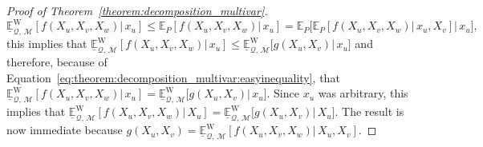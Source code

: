 \documentclass[10pt,a4paper]{paper}
\theoremstyle{definition}
\newcommand{\states}{\mathcal{X}}
\newcommand{\processes}{\mathbb{P}}
\newcommand{\wprocesses}{\processes^{\mathrm{W}}}
\newcommand{\rateset}{\mathcal{Q}}
\newcommand{\abs}[1]{\left\vert #1 \right\vert}
\newcommand{\coloneqq}{:\!=}
\begin{document}
\begin{proof}[Proof of Theorem~\ref{theorem:decomposition_multivar}]
\begin{equation*}
\underline{\mathbb{E}}^{\mathrm{W}}_{\rateset,\,\mathcal{M}}\left[f(X_u,X_v,X_w)\vert\,x_u\right]
\leq
\mathbb{E}_P\left[f(X_u,X_v,X_w)\vert\,x_u\right] = \mathbb{E}_P\bigl[\mathbb{E}_P\left[f(X_u,X_v,X_w)\vert\,x_u,X_v\right]\vert\,x_u\bigr],
\end{equation*}
this implies that
$\underline{\mathbb{E}}^{\mathrm{W}}_{\rateset,\,\mathcal{M}}\left[f(X_u,X_v,X_w)\vert\,x_u\right]\leq\underline{\mathbb{E}}^{\mathrm{W}}_{\rateset,\,\mathcal{M}}\bigl[g(X_u,X_v)\big\vert\,x_u\bigr]$ and therefore, because of Equation~\eqref{eq:theorem:decomposition_multivar:easyinequality}, that $\underline{\mathbb{E}}^{\mathrm{W}}_{\rateset,\,\mathcal{M}}\left[f(X_u,X_v,X_w)\vert\,x_u\right]=\underline{\mathbb{E}}^{\mathrm{W}}_{\rateset,\,\mathcal{M}}\bigl[g(X_u,X_v)\big\vert\,x_u\bigr]$. Since $x_u$ was arbitrary, this implies that $\underline{\mathbb{E}}^{\mathrm{W}}_{\rateset,\,\mathcal{M}}\left[f(X_u,X_v,X_w)\vert\,X_u\right]=\underline{\mathbb{E}}^{\mathrm{W}}_{\rateset,\,\mathcal{M}}\bigl[g(X_u,X_v)\big\vert\,X_u\bigr]$. The result is now immediate because $g(X_u,X_v)=\underline{\mathbb{E}}^{\mathrm{W}}_{\rateset,\,\mathcal{M}}\left[f(X_u,X_v,X_w)\vert\,X_u,X_v\right]$. 

\end{proof}
\end{document}
